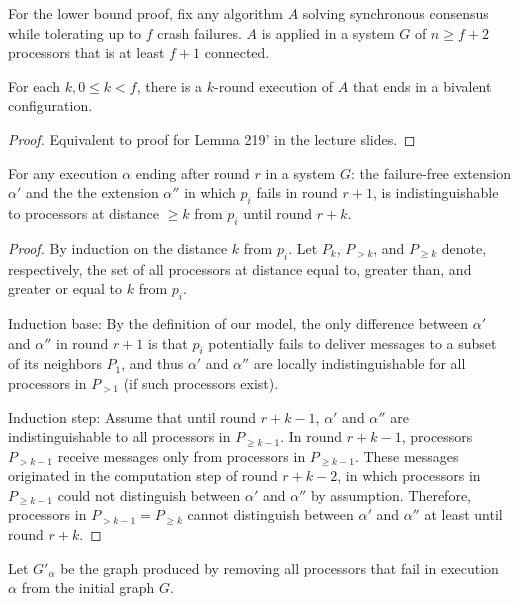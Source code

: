 For the lower bound proof, fix any algorithm $A$ solving synchronous consensus
while tolerating up to $f$ crash failures. $A$ is applied in a system $G$ of
$n \geq f+2$ processors that is at least $f+1$ connected.

\begin{lemma}
For each $k, 0 \leq k < f$, there is a $k$-round execution of $A$ that ends in
a bivalent configuration.
\end{lemma}

\begin{proof}
Equivalent to proof for Lemma 219' in the lecture slides.
\end{proof}

\begin{lemma} \label{lemma:indist_dist}
For any execution $\alpha$ ending after round $r$ in a system $G$: the failure-free
extension $\alpha'$ and the the extension $\alpha''$ in which $p_i$ fails in round $r+1$,
is indistinguishable to processors at distance $\geq k$ from $p_i$ until round $r+k$.
\end{lemma}

\begin{proof}
By induction on the distance $k$ from $p_i$. Let $P_k$, $P_{>k}$, and $P_{\geq k}$ denote,
respectively, the set of all processors at distance equal to, greater than, and
greater or equal to $k$ from $p_i$.

Induction base: By the definition of our model, the only difference 
between $\alpha'$ and $\alpha''$ in round $r+1$ is that $p_i$ potentially fails
to deliver messages to a subset of its neighbors $P_1$, and thus $\alpha'$ and $\alpha''$
are locally indistinguishable for all processors in $P_{>1}$ (if such processors exist).

Induction step: Assume that until round $r+k-1$, $\alpha'$ and $\alpha''$ are
indistinguishable to all processors in $P_{\geq k-1}$. In round $r+k-1$, processors
$P_{>k-1}$ receive messages only from processors in $P_{\geq k-1}$. These messages
originated in the computation step of round $r+k-2$, in which processors in $P_{\geq k-1}$
could not distinguish between $\alpha'$ and $\alpha''$ by assumption.
Therefore, processors in $P_{>k-1} = P_{\geq k}$ cannot distinguish between
$\alpha'$ and $\alpha''$ at least until round $r+k$.
\end{proof}

\begin{definition}
Let $G'_\alpha$ be the graph produced by removing all processors that fail
in execution $\alpha$ from the initial graph $G$.
\end{definition}

